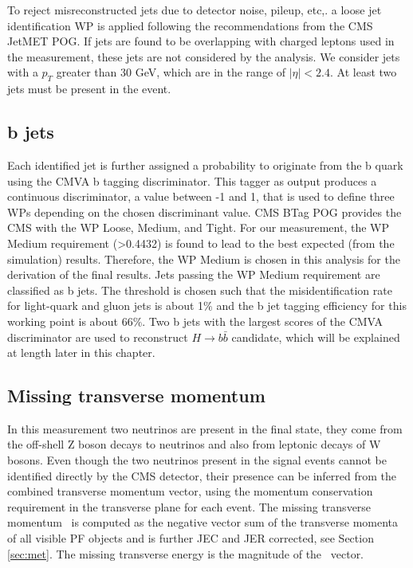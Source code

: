 \begin{small}
To reject misreconstructed jets due to detector noise, pileup, etc,. a loose jet identification WP is applied following the recommendations from the CMS JetMET POG. If jets are found to be overlapping with charged leptons used in the measurement, these jets are not considered by the analysis. We consider jets with a $p_T$ greater than 30 GeV, which are in the range of $|\eta| < 2.4$. At least two jets must be present in the event. 

\subsection{b jets}\label{sec:bjets}
Each identified jet is further assigned a probability to originate from the b quark using the CMVA b tagging discriminator. This tagger as output produces a continuous discriminator, a value between -1 and 1, that is used to define three WPs depending on the chosen discriminant value. CMS BTag POG provides the CMS with the WP Loose, Medium, and Tight. For our measurement, the WP Medium requirement (>0.4432) is found to lead to the best expected (from the simulation) results. Therefore, the WP Medium is chosen in this analysis for the derivation of the final results. Jets passing the WP Medium requirement are classified as b jets. The threshold is chosen such that the misidentification rate for light-quark and gluon jets is about 1$\%$ and the b jet tagging efficiency for this working point is about 66$\%$. Two b jets with the largest scores of the CMVA discriminator are used to reconstruct $H \to b\bar{b}$ candidate, which will be explained at length later in this chapter.  

\subsection{Missing transverse momentum}
In this measurement two neutrinos are present in the final state, they come from the off-shell Z boson decays to neutrinos and also from leptonic decays of W bosons. Even though the two neutrinos present in the signal events cannot be identified directly by the CMS detector, their presence can be inferred from the combined transverse momentum vector, using the momentum conservation requirement in the transverse plane for each event.  The missing transverse momentum ~\PTslash is computed as the negative vector sum of the transverse momenta of all visible PF objects and is further JEC and JER corrected, see Section \ref{sec:met}. The missing transverse energy \ETslash is the magnitude of the ~\PTslash vector. 


\end{small}

